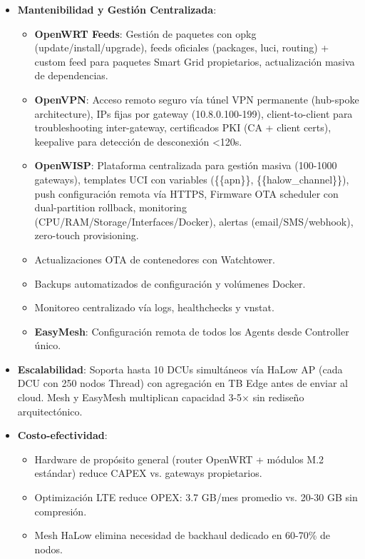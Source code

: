\begin{itemize}
    \item \textbf{Mantenibilidad y Gestión Centralizada}: 
    \begin{itemize}
        \item \textbf{OpenWRT Feeds}: Gestión de paquetes con opkg (update/install/upgrade), feeds oficiales (packages, luci, routing) + custom feed para paquetes Smart Grid propietarios, actualización masiva de dependencias.
        \item \textbf{OpenVPN}: Acceso remoto seguro vía túnel VPN permanente (hub-spoke architecture), IPs fijas por gateway (10.8.0.100-199), client-to-client para troubleshooting inter-gateway, certificados PKI (CA + client certs), keepalive para detección de desconexión <120s.
        \item \textbf{OpenWISP}: Plataforma centralizada para gestión masiva (100-1000 gateways), templates UCI con variables (\{\{apn\}\}, \{\{halow\_channel\}\}), push configuración remota vía HTTPS, Firmware OTA scheduler con dual-partition rollback, monitoring (CPU/RAM/Storage/Interfaces/Docker), alertas (email/SMS/webhook), zero-touch provisioning.
        \item Actualizaciones OTA de contenedores con Watchtower.
        \item Backups automatizados de configuración y volúmenes Docker.
        \item Monitoreo centralizado vía logs, healthchecks y vnstat.
        \item \textbf{EasyMesh}: Configuración remota de todos los Agents desde Controller único.
    \end{itemize}
    
    \item \textbf{Escalabilidad}: Soporta hasta 10 DCUs simultáneos vía HaLow AP (cada DCU con 250 nodos Thread) con agregación en TB Edge antes de enviar al cloud. Mesh y EasyMesh multiplican capacidad 3-5$\times$ sin rediseño arquitectónico.
    
    \item \textbf{Costo-efectividad}: 
    \begin{itemize}
        \item Hardware de propósito general (router OpenWRT + módulos M.2 estándar) reduce CAPEX vs. gateways propietarios.
        \item Optimización LTE reduce OPEX: 3.7 GB/mes promedio vs. 20-30 GB sin compresión.
        \item Mesh HaLow elimina necesidad de backhaul dedicado en 60-70\% de nodos.
    \end{itemize}
    

\end{itemize}
